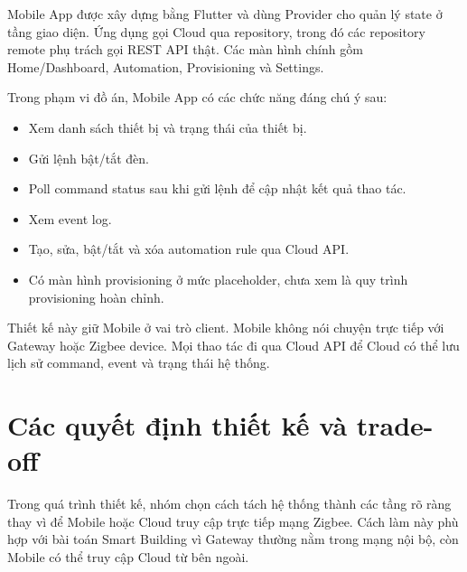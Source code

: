 Mobile App được xây dựng bằng Flutter và dùng Provider cho quản lý state ở tầng giao diện. Ứng dụng gọi Cloud qua repository, trong đó các repository remote phụ trách gọi REST API thật. Các màn hình chính gồm Home/Dashboard, Automation, Provisioning và Settings.

Trong phạm vi đồ án, Mobile App có các chức năng đáng chú ý sau:

\begin{itemize}[leftmargin=1.2cm]
    \item Xem danh sách thiết bị và trạng thái của thiết bị.
    \item Gửi lệnh bật/tắt đèn.
    \item Poll command status sau khi gửi lệnh để cập nhật kết quả thao tác.
    \item Xem event log.
    \item Tạo, sửa, bật/tắt và xóa automation rule qua Cloud API.
    \item Có màn hình provisioning ở mức placeholder, chưa xem là quy trình provisioning hoàn chỉnh.
\end{itemize}

Thiết kế này giữ Mobile ở vai trò client. Mobile không nói chuyện trực tiếp với Gateway hoặc Zigbee device. Mọi thao tác đi qua Cloud API để Cloud có thể lưu lịch sử command, event và trạng thái hệ thống.

\section{Các quyết định thiết kế và trade-off}
\label{sec:ch3-tradeoffs}

Trong quá trình thiết kế, nhóm chọn cách tách hệ thống thành các tầng rõ ràng thay vì để Mobile hoặc Cloud truy cập trực tiếp mạng Zigbee. Cách làm này phù hợp với bài toán Smart Building vì Gateway thường nằm trong mạng nội bộ, còn Mobile có thể truy cập Cloud từ bên ngoài.

